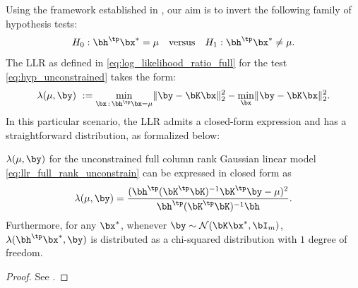\documentclass[11pt]{article}
\numberwithin{equation}{section}
\numberwithin{figure}{section}
\begin{document}
Using the framework established in , our aim is to invert the following family of hypothesis tests:
\begin{equation} \label{eq:hyp_unconstrained}
    H_0: \bh^\tp \bx^* = \mu \quad \text{versus} \quad H_1: \bh^\tp \bx^* \neq \mu.
\end{equation}
The LLR as defined in \eqref{eq:log_likelihood_ratio_full} for the test \eqref{eq:hyp_unconstrained} takes the form:
\begin{equation} \label{eq:llr_full_rank_unconstrain}
    \lambda(\mu, \by) ~:= \min_{\bx\,:\, \bh^\tp \bx = \mu} \lVert \by - \bK \bx \rVert_2^2 - \min_{\bx} \lVert \by - \bK \bx \rVert_2^2.
\end{equation}
In this particular scenario, the LLR admits a closed-form expression and has a straightforward distribution, as formalized below:
\begin{example} 
\label{lemma:unconstrchi2}
$\lambda(\mu, \by)$ for the unconstrained full column rank Gaussian linear model \eqref{eq:llr_full_rank_unconstrain} can be expressed in closed form as 
\begin{equation} \label{eq:test_stat_eq_unconstr}
\lambda(\mu, \by) = \frac{(\bh^\tp (\bK^\tp \bK)^{-1} \bK^\tp \by - \mu)^2}{\bh^\tp (\bK^\tp \bK)^{-1} \bh}.
\end{equation}
Furthermore, for any $\bx^*$, whenever $\by \sim \mathcal{N}(\bK\bx^*, \bI_m)$, $\lambda(\bh^\tp\bx^*, \by)$ is distributed as a chi-squared distribution with $1$ degree of freedom.
\end{example}
\begin{proof}
    See .
\end{proof}
\end{document}
